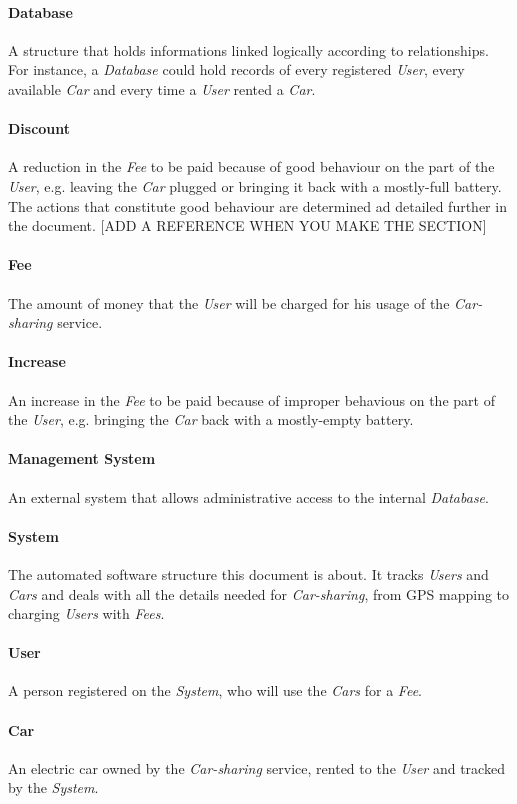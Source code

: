 \paragraph{Database}
A structure that holds informations linked logically according to relationships. For instance, a \emph{Database} could hold records of every registered \emph{User}, every available \emph{Car} and every time a \emph{User} rented a \emph{Car}.
\paragraph{Discount}
A reduction in the \emph{Fee} to be paid because of good behaviour on the part of the \emph{User}, e.g. leaving the \emph{Car} plugged or bringing it back with a mostly-full battery. The actions that constitute good behaviour are determined ad detailed further in the document. [ADD A REFERENCE WHEN YOU MAKE THE SECTION]
\paragraph{Fee}
The amount of money that the \emph{User} will be charged for his usage of the \emph{Car-sharing} service.
\paragraph{Increase}
An increase in the \emph{Fee} to be paid because of improper behavious on the part of the \emph{User}, e.g. bringing the \emph{Car} back with a mostly-empty battery.
\paragraph{Management System}
An external system that allows administrative access to the internal \emph{Database}.
\paragraph{System}
The automated software structure this document is about. It tracks \emph{Users} and \emph{Cars} and deals with all the details needed for \emph{Car-sharing}, from GPS mapping to charging \emph{Users} with \emph{Fees}.
\paragraph{User}
A person registered on the \emph{System}, who will use the \emph{Cars} for a \emph{Fee}.
\paragraph{Car}
An electric car owned by the \emph{Car-sharing} service, rented to the \emph{User} and tracked by the \emph{System}.

